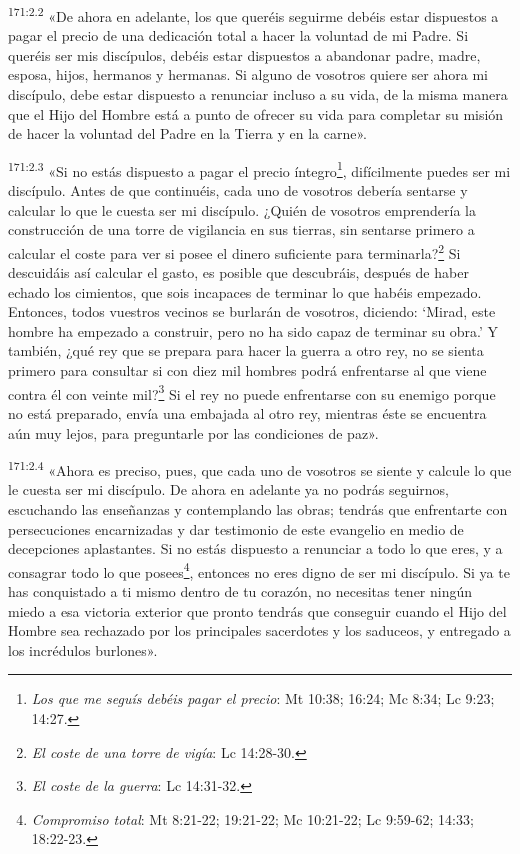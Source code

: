 \par 
\textsuperscript{171:2.2} «De ahora en adelante, los que queréis seguirme debéis estar dispuestos a pagar el precio de una dedicación total a hacer la voluntad de mi Padre. Si queréis ser mis discípulos, debéis estar dispuestos a abandonar padre, madre, esposa, hijos, hermanos y hermanas. Si alguno de vosotros quiere ser ahora mi discípulo, debe estar dispuesto a renunciar incluso a su vida, de la misma manera que el Hijo del Hombre está a punto de ofrecer su vida para completar su misión de hacer la voluntad del Padre en la Tierra y en la carne».

\par 
\textsuperscript{171:2.3} «Si no estás dispuesto a pagar el precio íntegro\footnote{\textit{Los que me seguís debéis pagar el precio}: Mt 10:38; 16:24; Mc 8:34; Lc 9:23; 14:27.}, difícilmente puedes ser mi discípulo. Antes de que continuéis, cada uno de vosotros debería sentarse y calcular lo que le cuesta ser mi discípulo. ¿Quién de vosotros emprendería la construcción de una torre de vigilancia en sus tierras, sin sentarse primero a calcular el coste para ver si posee el dinero suficiente para terminarla?\footnote{\textit{El coste de una torre de vigía}: Lc 14:28-30.} Si descuidáis así calcular el gasto, es posible que descubráis, después de haber echado los cimientos, que sois incapaces de terminar lo que habéis empezado. Entonces, todos vuestros vecinos se burlarán de vosotros, diciendo: `Mirad, este hombre ha empezado a construir, pero no ha sido capaz de terminar su obra.' Y también, ¿qué rey que se prepara para hacer la guerra a otro rey, no se sienta primero para consultar si con diez mil hombres podrá enfrentarse al que viene contra él con veinte mil?\footnote{\textit{El coste de la guerra}: Lc 14:31-32.} Si el rey no puede enfrentarse con su enemigo porque no está preparado, envía una embajada al otro rey, mientras éste se encuentra aún muy lejos, para preguntarle por las condiciones de paz».

\par 
\textsuperscript{171:2.4} «Ahora es preciso, pues, que cada uno de vosotros se siente y calcule lo que le cuesta ser mi discípulo. De ahora en adelante ya no podrás seguirnos, escuchando las enseñanzas y contemplando las obras; tendrás que enfrentarte con persecuciones encarnizadas y dar testimonio de este evangelio en medio de decepciones aplastantes. Si no estás dispuesto a renunciar a todo lo que eres, y a consagrar todo lo que posees\footnote{\textit{Compromiso total}: Mt 8:21-22; 19:21-22; Mc 10:21-22; Lc 9:59-62; 14:33; 18:22-23.}, entonces no eres digno de ser mi discípulo. Si ya te has conquistado a ti mismo dentro de tu corazón, no necesitas tener ningún miedo a esa victoria exterior que pronto tendrás que conseguir cuando el Hijo del Hombre sea rechazado por los principales sacerdotes y los saduceos, y entregado a los incrédulos burlones».

